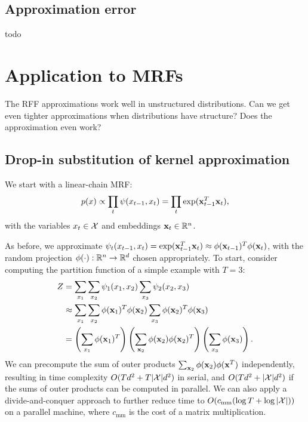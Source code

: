 \documentclass{article}
\begin{document}
\subsection{Approximation error}
todo

\section{Application to MRFs}
The RFF approximations work well in unstructured distributions.
Can we get even tighter approximations when distributions have structure?
Does the approximation even work?

\subsection{Drop-in substitution of kernel approximation}
We start with a linear-chain MRF:
$$p(x) \propto \prod_t \psi(x_{t-1},x_t) = \prod_t \exp(\mathbf{x}_{t-1}^T\mathbf{x}_t),$$
with the variables $x_t\in\mathcal{X}$ and embeddings $\mathbf{x}_t\in\mathbb{R}^n$.
\begin{figure}[h]
\centering
{}
\caption{
\label{fig:linear-chain}
}
\end{figure}
As before, we approximate
$\psi_t(x_{t-1}, x_t) = \exp(\mathbf{x}_{t-1}^T \mathbf{x}_t) \approx \phi(\mathbf{x}_{t-1})^T\phi(\mathbf{x}_t)$,
with the random projection $\phi(\cdot): \mathbb{R}^n \to \mathbb{R}^d$ chosen appropriately.
To start, consider computing the partition function of a simple example with $T=3$:
\begin{equation}
\begin{aligned}
Z
&= \sum_{x_1}\sum_{x_2} \psi_1(x_1, x_2) \sum_{x_3} \psi_2(x_2, x_3) \\
&\approx \sum_{x_1}\sum_{x_2} \phi(\mathbf{x}_1)^T\phi(\mathbf{x}_2) \sum_{x_3} \phi(\mathbf{x}_2)^T\phi(\mathbf{x}_3)\\
&= \left(\sum_{x_1} \phi(\mathbf{x}_1)^T\right) \left(\sum_{\mathbf{x}_2} \phi(\mathbf{x}_2)\phi(\mathbf{x}_2)^T\right)
    \left(\sum_{x_3}\phi(\mathbf{x}_3)\right).
\end{aligned}
\end{equation}
We can precompute the sum of outer products $\sum_{\mathbf{x}_2}\phi(\mathbf{x}_2)\phi(\mathbf{x}^T)$ independently,
resulting in time complexity $O(Td^2 + T|\mathcal{X}|d^2)$ in serial,
and $O(Td^2 + |\mathcal{X}|d^2)$ if the sums of outer products can be computed in parallel.
We can also apply a divide-and-conquer approach to further
reduce time to $O(c_{\textrm{mm}}(\log T + \log |\mathcal{X}|))$ on a parallel machine,
where $c_{\textrm{mm}}$ is the cost of a matrix multiplication.
\end{document}

